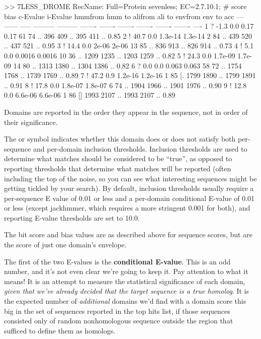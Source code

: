 \begin{samepage}
\begin{sreoutput}
>> 7LESS_DROME  RecName: Full=Protein sevenless;          EC=2.7.10.1;
   #    score  bias  c-Evalue  i-Evalue hmmfrom  hmm to    alifrom  ali to    envfrom  env to     acc
 ---   ------ ----- --------- --------- ------- -------    ------- -------    ------- -------    ----
   1 ?   -1.3   0.0      0.17      0.17      61      74 ..     396     409 ..     395     411 .. 0.85
   2 !   40.7   0.0   1.3e-14   1.3e-14       2      84 ..     439     520 ..     437     521 .. 0.95
   3 !   14.4   0.0     2e-06     2e-06      13      85 ..     836     913 ..     826     914 .. 0.73
   4 !    5.1   0.0    0.0016    0.0016      10      36 ..    1209    1235 ..    1203    1259 .. 0.82
   5 !   24.3   0.0   1.7e-09   1.7e-09      14      80 ..    1313    1380 ..    1304    1386 .. 0.82
   6 ?    0.0   0.0     0.063     0.063      58      72 ..    1754    1768 ..    1739    1769 .. 0.89
   7 !   47.2   0.9   1.2e-16   1.2e-16       1      85 [.    1799    1890 ..    1799    1891 .. 0.91
   8 !   17.8   0.0   1.8e-07   1.8e-07       6      74 ..    1904    1966 ..    1901    1976 .. 0.90
   9 !   12.8   0.0   6.6e-06   6.6e-06       1      86 []    1993    2107 ..    1993    2107 .. 0.89
\end{sreoutput}
\end{samepage}

Domains are reported in the order they appear in the sequence, not in
order of their significance.

The \ccode{!} or  symbol indicates whether this domain does
or does not satisfy both per-sequence and per-domain inclusion
thresholds. Inclusion thresholds are used to determine what matches
should be considered to be ``true'', as opposed to reporting
thresholds that determine what matches will be reported (often
including the top of the noise, so you can see what interesting
sequences might be getting tickled by your search). By default,
inclusion thresholds usually require a per-sequence E value of 0.01 or
less and a per-domain conditional E-value of 0.01 or less (except
jackhmmer, which requires a more stringent 0.001 for both), and
reporting E-value thresholds are set to 10.0.

The bit score and bias values are as described above for sequence
scores, but are the score of just one domain's envelope. 

The first of the two E-values is the \textbf{conditional
E-value}. This is an odd number, and it's not even clear we're going
to keep it. Pay attention to what it means! It is an attempt to
measure the statistical significance of each domain, \emph{given that
we've already decided that the target sequence is a true homolog}.  It
is the expected number of \emph{additional} domains we'd find with a
domain score this big in the set of sequences reported in the top hits
list, if those sequences consisted only of random nonhomologous
sequence outside the region that sufficed to define them as homologs. 

